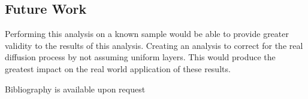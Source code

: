 \documentclass{article}
\begin{document}
\begin{multicols}{2}
\section{Future Work}

    Performing this analysis on a known sample would be able to provide greater validity to the results of this analysis.
    Creating an analysis to correct for the real diffusion process by not assuming uniform layers.
    This would produce the greatest impact on the real world application of these results.

% 

\end{multicols}
\vspace{75mm}
\raggedright
Bibliography is available upon request


% 
\end{document}
